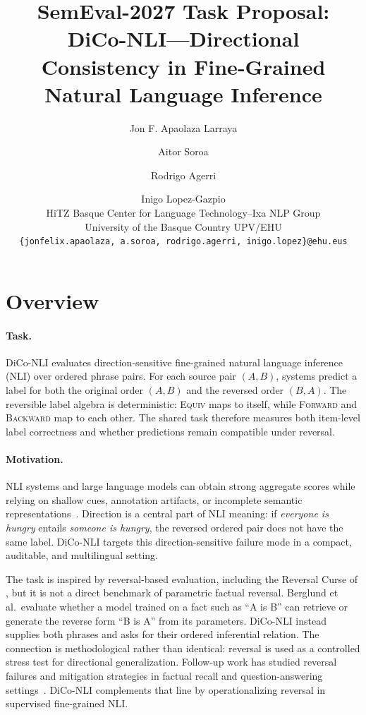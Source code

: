\documentclass[11pt]{article}
\title{SemEval-2027 Task Proposal: DiCo-NLI---Directional Consistency in Fine-Grained Natural Language Inference}
\author{
  Jon F. Apaolaza Larraya \and Aitor Soroa \and Rodrigo Agerri \and Inigo Lopez-Gazpio \\
  HiTZ Basque Center for Language Technology--Ixa NLP Group \\
  University of the Basque Country UPV/EHU \\
  \texttt{\{jonfelix.apaolaza, a.soroa, rodrigo.agerri, inigo.lopez\}@ehu.eus}
}
\newcommand{\EquivLabel}{\textsc{Equiv}}
\newcommand{\ForwardLabel}{\textsc{Forward}}
\newcommand{\BackwardLabel}{\textsc{Backward}}
\begin{document}
\maketitle

\section{Overview}

\paragraph{Task.}
DiCo-NLI evaluates direction-sensitive fine-grained natural language inference (NLI) over ordered phrase pairs.
For each source pair $(A,B)$, systems predict a label for both the original order $(A,B)$ and the reversed order $(B,A)$.
The reversible label algebra is deterministic: \EquivLabel{} maps to itself, while \ForwardLabel{} and \BackwardLabel{} map to each other.
The shared task therefore measures both item-level label correctness and whether predictions remain compatible under reversal.

\paragraph{Motivation.}
NLI systems and large language models can obtain strong aggregate scores while relying on shallow cues, annotation artifacts, or incomplete semantic representations~\cite{gururangan2018annotation,lopez2024revisiting}.
Direction is a central part of NLI meaning: if \emph{everyone is hungry} entails \emph{someone is hungry}, the reversed ordered pair does not have the same label.
DiCo-NLI targets this direction-sensitive failure mode in a compact, auditable, and multilingual setting.

The task is inspired by reversal-based evaluation, including the Reversal Curse of \citet{berglund2024reversal}, but it is not a direct benchmark of parametric factual reversal.
Berglund et al.\ evaluate whether a model trained on a fact such as ``A is B'' can retrieve or generate the reverse form ``B is A'' from its parameters.
DiCo-NLI instead supplies both phrases and asks for their ordered inferential relation.
The connection is methodological rather than identical: reversal is used as a controlled stress test for directional generalization.
Follow-up work has studied reversal failures and mitigation strategies in factual recall and question-answering settings~\cite{golovneva2024reverse,lin2024delving}.
DiCo-NLI complements that line by operationalizing reversal in supervised fine-grained NLI.
\end{document}
